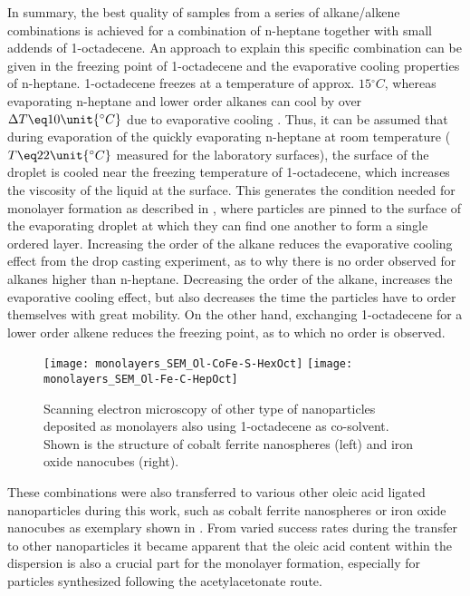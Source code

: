 \documentclass[\main/dresen_thesis.tex]{subfiles}
\begin{document}
  In summary, the best quality of samples from a series of alkane/alkene combinations is achieved for a combination of n-heptane together with small addends of 1-octadecene.
  An approach to explain this specific combination can be given in the freezing point of 1-octadecene and the evaporative cooling properties of n-heptane.
  1-octadecene freezes at a temperature of approx. $15 \unit{^\circ C}$, whereas evaporating n-heptane and lower order alkanes can cool by over $\Delta T \eq 10 \unit{^\circ C}$ due to evaporative cooling \cite{Tuckermann_2002_Evapo}.
  Thus, it can be assumed that during evaporation of the quickly evaporating n-heptane at room temperature ($T \eq 22 \unit{^\circ C}$ measured for the laboratory surfaces), the surface of the droplet is cooled near the freezing temperature of 1-octadecene, which increases the viscosity of the liquid at the surface.
  This generates the condition needed for monolayer formation as described in \cite{Bigioni_2006_Kinet}, where particles are pinned to the surface of the evaporating droplet at which they can find one another to form a single ordered layer.
  Increasing the order of the alkane reduces the evaporative cooling effect from the drop casting experiment, as to why there is no order observed for alkanes higher than n-heptane.
  Decreasing the order of the alkane, increases the evaporative cooling effect, but also decreases the time the particles have to order themselves with great mobility.
  On the other hand, exchanging 1-octadecene for a lower order alkene reduces the freezing point, as to which no order is observed.

  \begin{figure}[tb]
    \centering
    \texttt{[image: monolayers\_SEM\_Ol-CoFe-S-HexOct]}
    \texttt{[image: monolayers\_SEM\_Ol-Fe-C-HepOct]}
    \caption{\label{fig:monolayers:preparation:solventVariation:spheresIron}Scanning electron microscopy of other type of nanoparticles deposited as monolayers also using 1-octadecene as co-solvent. Shown is the structure of cobalt ferrite nanospheres (left) and iron oxide nanocubes (right).}
  \end{figure}
  These combinations were also transferred to various other oleic acid ligated nanoparticles during this work, such as cobalt ferrite nanospheres or iron oxide nanocubes as exemplary shown in .
  From varied success rates during the transfer to other nanoparticles it became apparent that the oleic acid content within the dispersion is also a crucial part for the monolayer formation, especially for particles synthesized following the acetylacetonate route.
\end{document}
